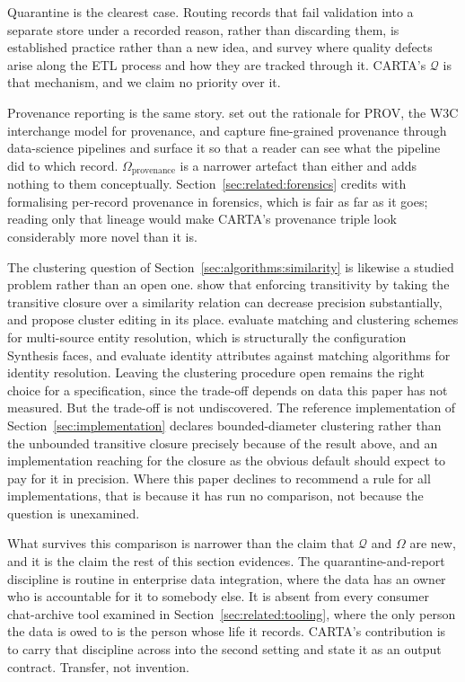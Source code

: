 Quarantine is the clearest case. Routing records that fail validation into a
separate store under a recorded reason, rather than discarding them, is
established practice rather than a new idea, and \citet{souibgui2019dataquality}
survey where quality defects arise along the ETL process and how they are tracked
through it. CARTA's $\mathcal{Q}$ is that mechanism, and we claim no priority over
it.

Provenance reporting is the same story. \citet{moreau2015prov} set out the
rationale for PROV, the W3C interchange model for provenance, and
\citet{chapman2024finegrained} capture fine-grained provenance through
data-science pipelines and surface it so that a reader can see what the pipeline
did to which record. $\Omega_{\text{provenance}}$ is a narrower artefact than
either and adds nothing to them conceptually.
Section~\ref{sec:related:forensics} credits \citet{chabot2014knowledge} with
formalising per-record provenance in forensics, which is fair as far as it goes;
reading only that lineage would make CARTA's provenance triple look considerably
more novel than it is.

The clustering question of Section~\ref{sec:algorithms:similarity} is likewise a
studied problem rather than an open one. \citet{baas2021transitivity} show that
enforcing transitivity by taking the transitive closure over a similarity relation
can decrease precision substantially, and propose cluster editing in its place.
\citet{saeedi2018famer} evaluate matching and clustering schemes for multi-source
entity resolution, which is structurally the configuration Synthesis faces, and
\citet{li2015identity} evaluate identity attributes against matching algorithms
for identity resolution. Leaving the clustering procedure open remains the right
choice for a specification, since the trade-off depends on data this paper has
not measured. But the trade-off is not undiscovered. The reference implementation
of Section~\ref{sec:implementation} declares bounded-diameter clustering rather
than the unbounded transitive closure precisely because of the result above, and
an implementation reaching for the closure as the obvious default should expect
to pay for it in precision. Where this paper declines to recommend a rule for
all implementations, that is because it has run no comparison, not because the
question is unexamined.

What survives this comparison is narrower than the claim that $\mathcal{Q}$ and
$\Omega$ are new, and it is the claim the rest of this section evidences. The
quarantine-and-report discipline is routine in enterprise data integration, where
the data has an owner who is accountable for it to somebody else. It is absent
from every consumer chat-archive tool examined in
Section~\ref{sec:related:tooling}, where the only person the data is owed to is
the person whose life it records. CARTA's contribution is to carry that discipline
across into the second setting and state it as an output contract. Transfer, not
invention.
